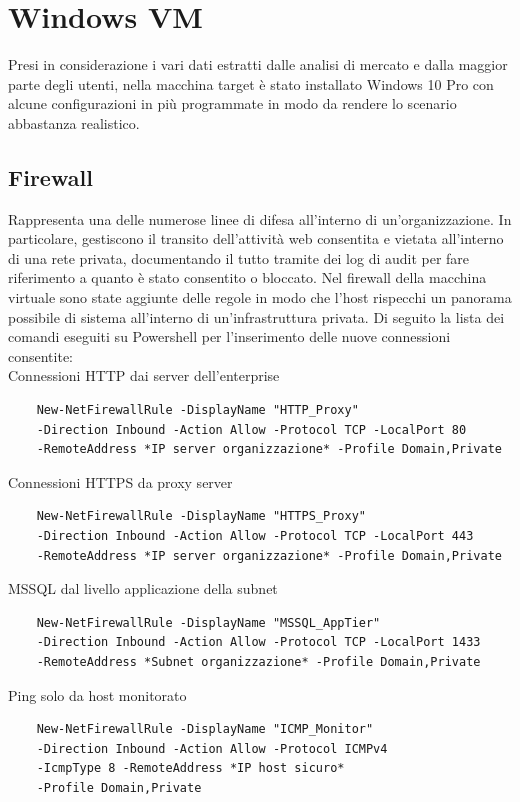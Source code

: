 \section{Windows VM\label{win}}
Presi in considerazione i vari dati estratti dalle analisi di mercato e dalla maggior parte degli utenti, nella macchina target è stato installato Windows 10 Pro con alcune configurazioni in più programmate in modo da rendere lo scenario abbastanza realistico.

    \subsection{Firewall}
    Rappresenta una delle numerose linee di difesa all'interno di un'organizzazione. In particolare, gestiscono il transito dell'attività web consentita e vietata all'interno di una rete privata, documentando il tutto tramite dei log di audit per fare riferimento a quanto è stato consentito o bloccato. Nel firewall della macchina virtuale sono state aggiunte delle regole in modo che l'host rispecchi un panorama possibile di sistema all'interno di un'infrastruttura privata. Di seguito la lista dei comandi eseguiti su Powershell per l'inserimento delle nuove connessioni consentite:\\

    \noindent
    \textsf{Connessioni HTTP dai server dell'enterprise}
    \begin{Verbatim}
    New-NetFirewallRule -DisplayName "HTTP_Proxy"
    -Direction Inbound -Action Allow -Protocol TCP -LocalPort 80
    -RemoteAddress *IP server organizzazione* -Profile Domain,Private
    \end{Verbatim}

    \noindent
    \textsf{Connessioni HTTPS da proxy server}
    \begin{Verbatim}
    New-NetFirewallRule -DisplayName "HTTPS_Proxy"
    -Direction Inbound -Action Allow -Protocol TCP -LocalPort 443
    -RemoteAddress *IP server organizzazione* -Profile Domain,Private
    \end{Verbatim}

    \noindent
    \textsf{MSSQL dal livello applicazione della subnet}
    \begin{Verbatim}
    New-NetFirewallRule -DisplayName "MSSQL_AppTier"
    -Direction Inbound -Action Allow -Protocol TCP -LocalPort 1433
    -RemoteAddress *Subnet organizzazione* -Profile Domain,Private
    \end{Verbatim}

    \noindent
    \textsf{Ping solo da host monitorato}
    \begin{Verbatim}
    New-NetFirewallRule -DisplayName "ICMP_Monitor"
    -Direction Inbound -Action Allow -Protocol ICMPv4
    -IcmpType 8 -RemoteAddress *IP host sicuro* 
    -Profile Domain,Private      
    \end{Verbatim}

